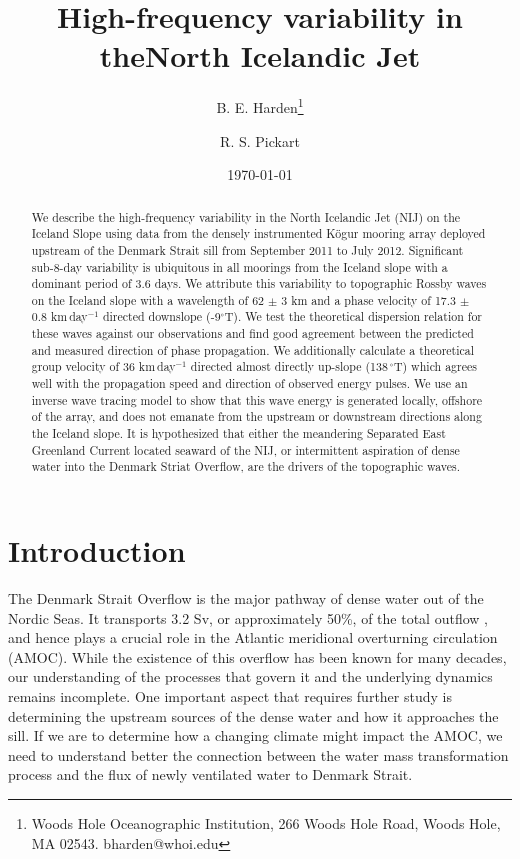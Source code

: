 \documentclass[12pt,titlepage,figuresatend]{article}
\title{High-frequency variability in the\authorcr North Icelandic Jet}
\author{B. E. Harden\footnote{Woods Hole Oceanographic Institution, 266 Woods Hole Road, Woods Hole, MA 02543. bharden@whoi.edu}}
\author{R. S. Pickart}
\affil{Woods Hole Oceanographic Institution, Woods Hole, USA}
\date{\today}
\begin{document}
\maketitle

\begin{abstract}
We describe the high-frequency variability in the North Icelandic Jet (NIJ) on the Iceland Slope using data from the densely instrumented K\"{o}gur mooring array deployed upstream of the Denmark Strait sill from September 2011 to July 2012. Significant sub-8-day variability is ubiquitous in all moorings from the Iceland slope with a dominant period of 3.6 days. We attribute this variability to topographic Rossby waves on the Iceland slope with a wavelength of 62 $\pm$ 3 km and a phase velocity of 17.3 $\pm$ 0.8 km$\,$day$^{-1}$ directed downslope (-9$^{\circ}$T). We test the theoretical dispersion relation for these waves against our observations and find good agreement between the predicted and measured direction of phase propagation. We additionally calculate a theoretical group velocity of 36 km$\,$day$^{-1}$ directed almost directly up-slope (138$\,^{\circ}$T) which agrees well with the propagation speed and direction of observed energy pulses. We use an inverse wave tracing model to show that this wave energy is generated locally, offshore of the array, and does not emanate from the upstream or downstream directions along the Iceland slope. It is hypothesized that either the meandering Separated East Greenland Current located seaward of the NIJ, or intermittent aspiration of dense water into the Denmark Striat Overflow, are the drivers of the topographic waves. 

\end{abstract}

\section{Introduction}

The Denmark Strait Overflow is the major pathway of dense water out of the Nordic Seas. It transports 3.2 Sv, or approximately 50\%, of the total outflow \cite[]{Dickson1994,Jochumsen2017}, and hence plays a crucial role in the Atlantic meridional overturning circulation (AMOC). While the existence of this overflow has been known for many decades, our understanding of the processes that govern it and the underlying dynamics remains incomplete. One important aspect that requires further study is determining the upstream sources of the dense water and how it approaches the sill. If we are to determine how a changing climate might impact the AMOC, we need to understand better the connection between the water mass transformation process and the flux of newly ventilated water to Denmark Strait. 
\end{document}
